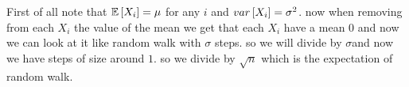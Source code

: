 \begin{insight}
First of all note that $\mathbb{E}\left[X_{i}\right]=\mu$ for any $i$ and $var\left[X_{i}\right]=\sigma^{2}$.
now when removing from each $X_{i}$ the value of the mean we get
that each $X_{i}$ have a mean 0 and now we can look at it like random
walk with $\sigma$ steps. so we will divide by $\sigma$and now we
have steps of size around $1$. so we divide by $\sqrt{n}$ which
is the expectation of random walk.%
\end{insight}
